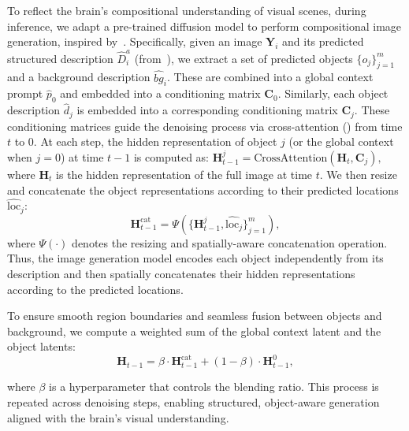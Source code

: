 To reflect the brain's compositional understanding of visual scenes, during inference, we adapt a pre-trained diffusion model to perform compositional image generation, inspired by~\citep{yang2024mastering}. Specifically,
given an image $\mathbf{Y}_i$ and its predicted structured description $\hat{D}_i^a$ (from~), we extract a set of predicted objects $\{o_j\}_{j=1}^m$ and a background description $\hat{bg}_i$. These are combined into a global context prompt $\hat{p}_0$ and embedded into a conditioning matrix $\mathbf{C}_0$. Similarly, each object description $\hat{d}_j$ is embedded into a corresponding conditioning matrix $\mathbf{C}_j$. These conditioning matrices guide the denoising process via cross-attention () from time $t$ to 0. At each step, the hidden representation of object $j$ (or the global context when $j = 0$) at time $t-1$ is computed as: $\mathbf{H}_{t-1}^j = \text{CrossAttention}(\mathbf{H}_t, \mathbf{C}_j),$ where $\mathbf{H}_t$ is the hidden representation of the full image at time $t$. We then resize and concatenate the object representations according to their predicted locations $\hat{\text{loc}}_j$:
\begin{equation}
    \mathbf{H}_{t-1}^{\text{cat}}=\Psi(\{\mathbf{H}_{t-1}^j, \hat{\text{loc}}_j\}_{j=1}^m),
\end{equation}
where $\Psi(\cdot)$ denotes the resizing and spatially-aware concatenation operation. Thus, the image generation model encodes each object independently from its description and then spatially concatenates their hidden representations according to the predicted locations.

To ensure smooth region boundaries and seamless fusion between objects and background, we compute a weighted sum of the global context latent and the object latents:
\begin{equation}
    \mathbf{H}_{t-1} = \beta \cdot \mathbf{H}_{t-1}^{\text{cat}} + (1 - \beta) \cdot \mathbf{H}_{t-1}^{0},
\end{equation}

where $\beta$ is a hyperparameter that controls the blending ratio. This process is repeated across denoising steps, enabling structured, object-aware generation aligned with the brain's visual understanding.

